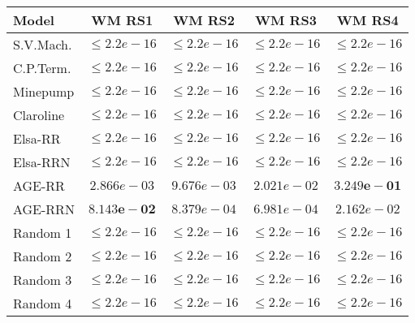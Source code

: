 \begin{small} 
\begin{tabular}{lcccc}
\hline 
\textbf{Model} & \textbf{ WM RS1 } & \textbf{ WM RS2 } & \textbf{ WM RS3 } & \textbf{ WM RS4 } \\ 
\hline 
S.V.Mach.   & $\le 2.2e-16$ & $\le 2.2e-16$ & $\le 2.2e-16$ & $\le 2.2e-16$ \\ 
C.P.Term.   & $\le 2.2e-16$ & $\le 2.2e-16$ & $\le 2.2e-16$ & $\le 2.2e-16$ \\ 
Minepump    & $\le 2.2e-16$ & $\le 2.2e-16$ & $\le 2.2e-16$ & $\le 2.2e-16$ \\ 
Claroline   & $\le 2.2e-16$ & $\le 2.2e-16$ & $\le 2.2e-16$ & $\le 2.2e-16$ \\
Elsa-RR     & $\le 2.2e-16$ & $\le 2.2e-16$ & $\le 2.2e-16$ & $\le 2.2e-16$ \\
Elsa-RRN   & $\le 2.2e-16$ & $\le 2.2e-16$ & $\le 2.2e-16$ & $\le 2.2e-16$ \\
AGE-RR   & $2.866e-03$ & $9.676e-03$ & $2.021e-02$ & $\mathbf{3.249e-01}$ \\
AGE-RRN   & $\mathbf{8.143e-02}$ & $8.379e-04$ & $6.981e-04$ & $2.162e-02$ \\
Random 1   & $\le 2.2e-16$ & $\le 2.2e-16$ & $\le 2.2e-16$ & $\le 2.2e-16$ \\
Random 2   & $\le 2.2e-16$ & $\le 2.2e-16$ & $\le 2.2e-16$ & $\le 2.2e-16$ \\
Random 3   & $\le 2.2e-16$ & $\le 2.2e-16$ & $\le 2.2e-16$ & $\le 2.2e-16$ \\
Random 4   & $\le 2.2e-16$ & $\le 2.2e-16$ & $\le 2.2e-16$ & $\le 2.2e-16$ \\
\hline 
\end{tabular} 
\end{small}

\vspace{1em}


